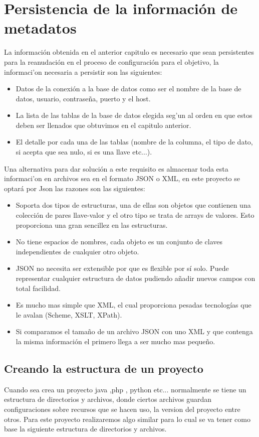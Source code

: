 \section{Persistencia de la informaci\'on de metadatos}
La informaci\'on obtenida en el anterior capitulo es necesario que sean persistentes para la reanudaci\'on  en el proceso de configuraci\'on para el objetivo, la informaci'on necesaria a persistir son las siguientes:
\begin{itemize}
\item Datos de la conexi\'on a la base de datos como ser el nombre de la base de datos, usuario, contrase\~na, puerto y el host.
\item La lista de las tablas de la base de datos elegida seg'un al orden en que estos deben ser llenados que obtuvimos en el capitulo anterior.
\item El detalle por cada una de las tablas (nombre de la columna, el tipo de dato, si acepta que sea nulo, si es una llave etc...).  
\end{itemize}
Una alternativa para dar soluci\'on a este requisito es almacenar toda esta informaci'on en archivos sea en el formato JSON o XML, en este proyecto se optar\'a por Json las razones son las siguientes:

\begin{itemize}
\item Soporta dos tipos de estructuras, una de ellas son objetos que contienen una colecci\'on de pares llave-valor y el otro tipo se trata de arrays de valores. Esto proporciona una gran sencillez en las estructuras.
\item No tiene espacios de nombres, cada objeto es un conjunto de claves independientes de cualquier otro objeto.
\item JSON no necesita ser extensible por que es flexible por s\'i solo. Puede representar cualquier estructura de datos pudiendo a\~nadir nuevos campos con total facilidad.
\item Es mucho mas simple que XML, el cual proporciona pesadas tecnolog\'ias que le avalan (Scheme, XSLT, XPath).
\item Si comparamos el tama\~no de un archivo JSON con uno XML y que contenga la misma informaci\'on el primero llega a ser mucho mas peque\~no.
\end{itemize} 
\subsection{Creando la estructura de un proyecto}
Cuando sea crea un proyecto java ,php , python etc... normalmente se tiene un estructura de directorios y archivos, donde ciertos archivos guardan configuraciones sobre recursos que se hacen uso, la version del proyecto entre otros. Para este proyecto realizaremos algo similar para lo cual se va tener como base la siguiente estructura de directorios y archivos.\\

